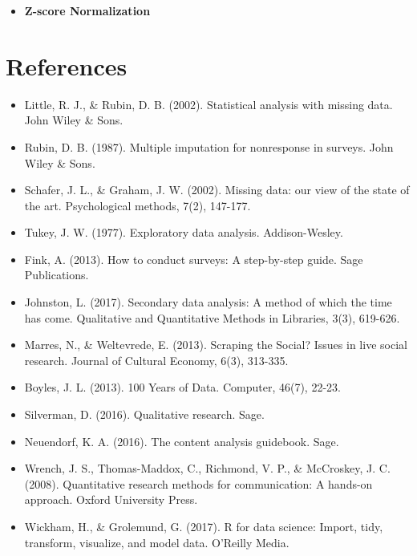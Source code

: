 \documentclass[
  b5paper]{book}
\newenvironment{Shaded}{\begin{snugshade}}{\end{snugshade}}
\newcommand{\FunctionTok}[1]{\textcolor[rgb]{0.13,0.29,0.53}{\textbf{#1}}}
\newcommand{\NormalTok}[1]{#1}
\newcommand{\OtherTok}[1]{\textcolor[rgb]{0.56,0.35,0.01}{#1}}
\newcommand{\SpecialCharTok}[1]{\textcolor[rgb]{0.81,0.36,0.00}{\textbf{#1}}}
\providecommand{\tightlist}{%
  \setlength{\itemsep}{0pt}\setlength{\parskip}{0pt}}
\begin{document}
\begin{itemize}
\tightlist
\item
  \textbf{Z-score Normalization}
\end{itemize}

\begin{Shaded}
\end{Shaded}

\hypertarget{references-2}{%
\section{References}\label{references-2}}

\begin{itemize}
\tightlist
\item
  Little, R. J., \& Rubin, D. B. (2002). Statistical analysis with missing data. John Wiley \& Sons.
\item
  Rubin, D. B. (1987). Multiple imputation for nonresponse in surveys. John Wiley \& Sons.
\item
  Schafer, J. L., \& Graham, J. W. (2002). Missing data: our view of the state of the art. Psychological methods, 7(2), 147-177.
\item
  Tukey, J. W. (1977). Exploratory data analysis. Addison-Wesley.
\item
  Fink, A. (2013). How to conduct surveys: A step-by-step guide. Sage Publications.
\item
  Johnston, L. (2017). Secondary data analysis: A method of which the time has come. Qualitative and Quantitative Methods in Libraries, 3(3), 619-626.
\item
  Marres, N., \& Weltevrede, E. (2013). Scraping the Social? Issues in live social research. Journal of Cultural Economy, 6(3), 313-335.
\item
  Boyles, J. L. (2013). 100 Years of Data. Computer, 46(7), 22-23.
\item
  Silverman, D. (2016). Qualitative research. Sage.
\item
  Neuendorf, K. A. (2016). The content analysis guidebook. Sage.
\item
  Wrench, J. S., Thomas-Maddox, C., Richmond, V. P., \& McCroskey, J. C. (2008). Quantitative research methods for communication: A hands-on approach. Oxford University Press.
\item
  Wickham, H., \& Grolemund, G. (2017). R for data science: Import, tidy, transform, visualize, and model data. O'Reilly Media.
\end{itemize}
\end{document}
